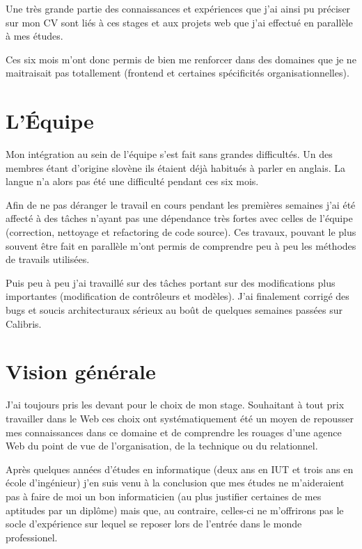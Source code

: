 \documentclass[12pt,a4paper]{book}
\begin{document}
Une très grande partie des connaissances et expériences que j'ai ainsi pu préciser sur mon CV sont liés à ces stages et aux projets web que j'ai effectué en parallèle à mes études.

Ces six mois m'ont donc permis de bien me renforcer dans des domaines que je ne maitraisait pas totallement (frontend et certaines spécificités organisationnelles).

\section{L'Équipe}

Mon intégration au sein de l'équipe s'est fait sans grandes difficultés. Un des membres étant d'origine slovène ils étaient déjà habitués à parler en anglais. La langue n'a alors pas été une difficulté pendant ces six mois.

Afin de ne pas déranger le travail en cours pendant les premières semaines j'ai été affecté à des tâches n'ayant pas une dépendance très fortes avec celles de l'équipe (correction, nettoyage et refactoring de code source). Ces travaux, pouvant le plus souvent être fait en parallèle m'ont permis de comprendre peu à peu les méthodes de travails utilisées.

Puis peu à peu j'ai travaillé sur des tâches portant sur des modifications plus importantes (modification de contrôleurs et modèles). J'ai finalement corrigé des bugs et soucis architecturaux sérieux au boût de quelques semaines passées sur Calibris.

\section{Vision générale}

J'ai toujours pris les devant pour le choix de mon stage. Souhaitant à tout prix travailler dans le Web ces choix ont systématiquement été un moyen de repousser mes connaissances dans ce domaine et de comprendre les rouages d'une agence Web du point de vue de l'organisation, de la technique ou du relationnel.

Après quelques années d'études en informatique (deux ans en IUT et trois ans en école d'ingénieur) j'en suis venu à la conclusion que mes études ne m'aideraient pas à faire de moi un bon informaticien (au plus justifier certaines de mes aptitudes par un diplôme) mais que, au contraire, celles-ci ne m'offrirons pas le socle d'expérience sur lequel se reposer lors de l'entrée dans le monde professionel.
\end{document}
